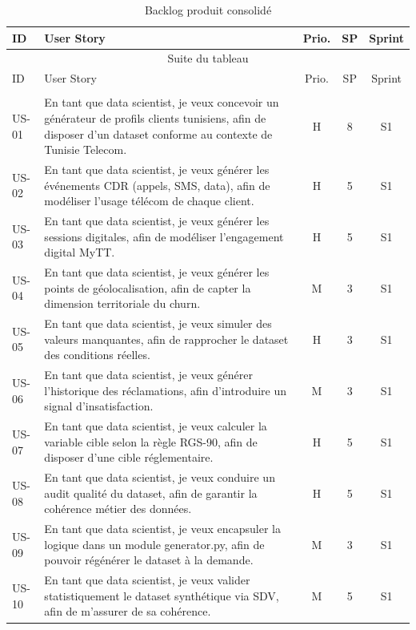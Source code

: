 \begin{footnotesize}
\begin{longtable}{|p{1.2cm}|p{8.5cm}|c|c|c|}
\caption{Backlog produit consolidé}
\label{tab:backlog_produit} \\
\hline
ID & User Story & Prio. & SP & Sprint \\
\hline
\endfirsthead
\multicolumn{5}{c}{Suite du tableau} \\
\hline
ID & User Story & Prio. & SP & Sprint \\
\hline
\endhead
\hline
\endfoot

\multicolumn{5}{|l|}{Epic 1: Construction du jeu de données synthétique} \\
\hline
US-01 & En tant que data scientist, je veux concevoir un générateur de profils clients tunisiens, afin de disposer d'un dataset conforme au contexte de Tunisie Telecom. & H & 8 & S1 \\
\hline
US-02 & En tant que data scientist, je veux générer les événements CDR (appels, SMS, data), afin de modéliser l'usage télécom de chaque client. & H & 5 & S1 \\
\hline
US-03 & En tant que data scientist, je veux générer les sessions digitales, afin de modéliser l'engagement digital MyTT. & H & 5 & S1 \\
\hline
US-04 & En tant que data scientist, je veux générer les points de géolocalisation, afin de capter la dimension territoriale du churn. & M & 3 & S1 \\
\hline
US-05 & En tant que data scientist, je veux simuler des valeurs manquantes, afin de rapprocher le dataset des conditions réelles. & H & 3 & S1 \\
\hline
US-06 & En tant que data scientist, je veux générer l'historique des réclamations, afin d'introduire un signal d'insatisfaction. & M & 3 & S1 \\
\hline
US-07 & En tant que data scientist, je veux calculer la variable cible selon la règle RGS-90, afin de disposer d'une cible réglementaire. & H & 5 & S1 \\
\hline
US-08 & En tant que data scientist, je veux conduire un audit qualité du dataset, afin de garantir la cohérence métier des données. & H & 5 & S1 \\
\hline
US-09 & En tant que data scientist, je veux encapsuler la logique dans un module generator.py, afin de pouvoir régénérer le dataset à la demande. & M & 3 & S1 \\
\hline
US-10 & En tant que data scientist, je veux valider statistiquement le dataset synthétique via SDV, afin de m'assurer de sa cohérence. & M & 5 & S1 \\
\hline


\end{longtable}
\end{footnotesize}

